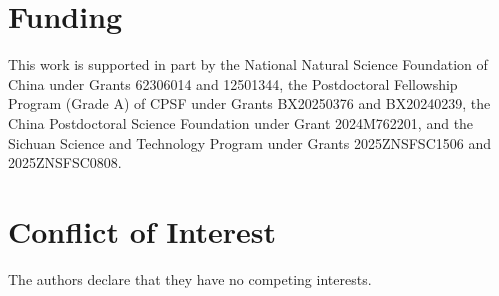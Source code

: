 \section*{Funding}

This work is supported in part by the National Natural Science Foundation of China under Grants 62306014 and 12501344, the Postdoctoral Fellowship Program (Grade A) of CPSF under Grants BX20250376 and BX20240239, the China Postdoctoral Science Foundation under Grant 2024M762201, and the Sichuan Science and Technology Program under Grants 2025ZNSFSC1506 and 2025ZNSFSC0808.

\section*{Conflict of Interest}

The authors declare that they have no competing interests.
